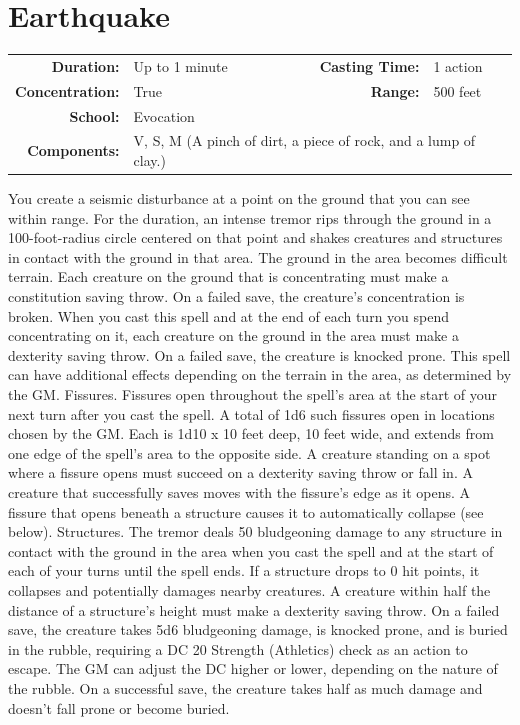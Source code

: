 \documentclass[12pt]{memoir}
\begin{document}
\section*{Earthquake}

{
\small\centering\vspace{-6pt}
\begin{tabular}{rlrl}
\toprule

\textbf{Duration:} & Up to 1 minute &
\textbf{Casting Time:} & 1 action \\
\textbf{Concentration:} & True &
\textbf{Range:} & 500 feet \\
\textbf{School:} & Evocation \\
\textbf{Components:} & \multicolumn{3}{p{0.7\textwidth}}{V, S, M (A pinch of dirt, a piece of rock, and a lump of clay.)}\\

\bottomrule
\end{tabular}
}

\vspace{1\baselineskip}\noindent You create a seismic disturbance at a point on the ground that you can see within range. For the duration, an intense tremor rips through the ground in a 100-foot-radius circle centered on that point and shakes creatures and structures in contact with the ground in that area. The ground in the area becomes difficult terrain. Each creature on the ground that is concentrating must make a constitution saving throw. On a failed save, the creature's concentration is broken. When you cast this spell and at the end of each turn you spend concentrating on it, each creature on the ground in the area must make a dexterity saving throw. On a failed save, the creature is knocked prone. This spell can have additional effects depending on the terrain in the area, as determined by the GM. Fissures. Fissures open throughout the spell's area at the start of your next turn after you cast the spell. A total of 1d6 such fissures open in locations chosen by the GM. Each is 1d10 x 10 feet deep, 10 feet wide, and extends from one edge of the spell's area to the opposite side. A creature standing on a spot where a fissure opens must succeed on a dexterity saving throw or fall in. A creature that successfully saves moves with the fissure's edge as it opens. A fissure that opens beneath a structure causes it to automatically collapse (see below). Structures. The tremor deals 50 bludgeoning damage to any structure in contact with the ground in the area when you cast the spell and at the start of each of your turns until the spell ends. If a structure drops to 0 hit points, it collapses and potentially damages nearby creatures. A creature within half the distance of a structure's height must make a dexterity saving throw. On a failed save, the creature takes 5d6 bludgeoning damage, is knocked prone, and is buried in the rubble, requiring a DC 20 Strength (Athletics) check as an action to escape. The GM can adjust the DC higher or lower, depending on the nature of the rubble. On a successful save, the creature takes half as much damage and doesn't fall prone or become buried.
\end{document}

